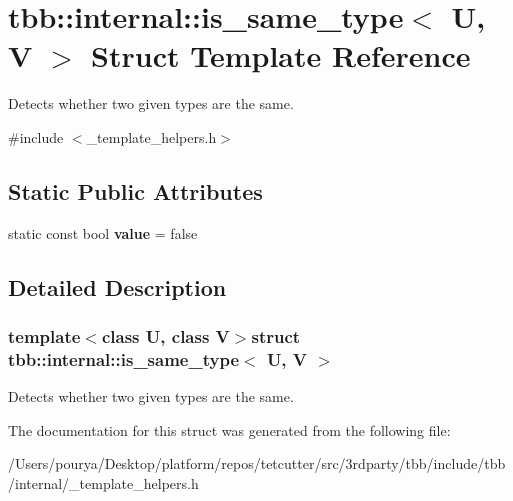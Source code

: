 \hypertarget{structtbb_1_1internal_1_1is__same__type}{}\section{tbb\+:\+:internal\+:\+:is\+\_\+same\+\_\+type$<$ U, V $>$ Struct Template Reference}
\label{structtbb_1_1internal_1_1is__same__type}


Detects whether two given types are the same.  




{\ttfamily \#include $<$\+\_\+template\+\_\+helpers.\+h$>$}

\subsection*{Static Public Attributes}
\begin{DoxyCompactItemize}
\item 
\hypertarget{structtbb_1_1internal_1_1is__same__type_a4a0a4e95af4e6b3238d60d3fd9d2a07d}{}static const bool {\bfseries value} = false\label{structtbb_1_1internal_1_1is__same__type_a4a0a4e95af4e6b3238d60d3fd9d2a07d}

\end{DoxyCompactItemize}


\subsection{Detailed Description}
\subsubsection*{template$<$class U, class V$>$struct tbb\+::internal\+::is\+\_\+same\+\_\+type$<$ U, V $>$}

Detects whether two given types are the same. 

The documentation for this struct was generated from the following file\+:\begin{DoxyCompactItemize}
\item 
/\+Users/pourya/\+Desktop/platform/repos/tetcutter/src/3rdparty/tbb/include/tbb/internal/\+\_\+template\+\_\+helpers.\+h\end{DoxyCompactItemize}
